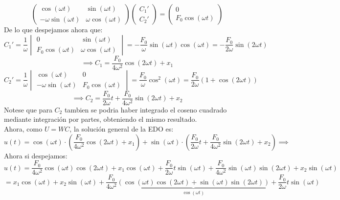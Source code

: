 {\begin{enumerate}
\[\begin{pmatrix}
                \cos(\omega t) & \sin(\omega t) \\
                -\omega \sin(\omega t) & \omega \cos(\omega t)
            \end{pmatrix}
            \begin{pmatrix}
                C_1' \\ C_2'
            \end{pmatrix}
            =
            \begin{pmatrix}
                0 \\ F_0 \cos(\omega t)
            \end{pmatrix}
        \]
        De lo que despejamos ahora que:
        \[
            C_1' =
            \frac{1}{\omega}
            \begin{vmatrix}
                0 & \sin(\omega t) \\
                F_0 \cos(\omega t) & \omega \cos(\omega t)
            \end{vmatrix}
            = - \frac{F_0}{\omega} \sin(\omega t) \cos(\omega t) =
            - \frac{F_0}{2\omega} \sin(2\omega t)
        \]
        \[
            \implies \boxed{C_1 = \frac{F_0}{4\omega^2} \cos(2\omega t) + x_1}
        \]
        \[
            C_2' =
            \frac{1}{\omega}
            \begin{vmatrix}
                \cos(\omega t) & 0 \\
                -\omega \sin(\omega t) & F_0 \cos(\omega t)
            \end{vmatrix}
            = \frac{F_0}{\omega} \cos^2(\omega t) =
            \frac{F_0}{2\omega} (1 + \cos(2\omega t))
        \]
        \[
            \implies \boxed{C_2 = \frac{F_0}{2\omega} t + \frac{F_0}{4\omega^2} \sin(2\omega t) + x_2}
        \]
        Notese que para $C_2$ tambien se podria haber integrado el coseno cuadrado mediante integración por partes, obteniendo el mismo resultado.\\
        Ahora, como $U = W C$, la solución general de la EDO es:
        \[
            u(t) = \cos(\omega t) \cdot \left(\frac{F_0}{4\omega^2} \cos(2\omega t) + x_1\right) + \sin(\omega t) \cdot \left(\frac{F_0}{2\omega} t + \frac{F_0}{4\omega^2} \sin(2\omega t) + x_2\right) \implies
        \]
        Ahora si despejamos:
        \[
            u(t) = \frac{F_0}{4\omega^2} \cos(\omega t) \cos(2\omega t) + x_1 \cos(\omega t) + \frac{F_0}{2\omega} t \sin(\omega t) + \frac{F_0}{4\omega^2} \sin(\omega t) \sin(2\omega t) + x_2 \sin(\omega t)
        \]
        \[
            = x_1 \cos(\omega t) + x_2 \sin(\omega t) + \frac{F_0}{4\omega^2} \underbrace{ \left( \cos(\omega t) \cos(2\omega t) + \sin(\omega t) \sin(2\omega t) \right)}_{\cos(\omega t)} + \frac{F_0}{2\omega} t \sin(\omega t)
\]
\end{enumerate}}
